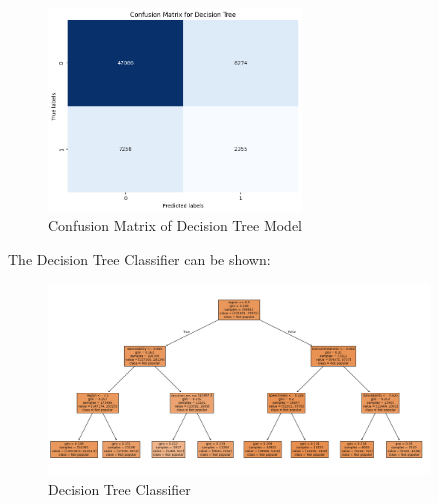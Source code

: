 \begin{figure}[h] 
    \centering 
    \includegraphics[width=0.6\textwidth]{media/decision_tree_conf_matr.png}
    \caption{Confusion Matrix of Decision Tree Model}

\end{figure}

The Decision Tree Classifier can be shown:

\begin{figure}[H] 
    \centering 
    \includegraphics[width=0.9\textwidth]{media/decision_tree.png}
    \caption{Decision Tree Classifier}
    \label{fig:decision_tree}
\end{figure}



